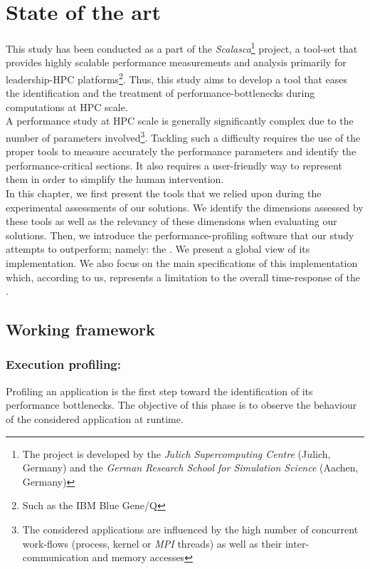 



\chapter{State of the art}\label{chapter:stateOfTheArt}
	This study has been conducted as a part of the \emph{Scalasca}\footnote{The project is developed by the \emph{J$\ddot{u}$lich Supercomputing Centre} (J$\ddot{u}$lich, Germany) and the \emph{German Research School for Simulation Science} (Aachen, Germany)} \cite{zhukov2013assessing} project, a tool-set that provides highly scalable performance measurements and analysis primarily for leadership-HPC platforms\footnote{Such as the IBM Blue Gene/Q}.
	Thus, this study aims to develop a tool that eases the identification and the treatment of performance-bottlenecks during computations at HPC scale.\\

	A performance study at HPC scale is generally significantly complex due to the number of parameters involved\footnote{The considered applications are influenced by the high number of concurrent work-flows (process, kernel or \emph{MPI} threads) as well as their inter-communication and memory accesses}.   Tackling such a difficulty requires the use of the proper tools to measure accurately the performance parameters and identify the performance-critical sections.   It also requires a user-friendly way to represent them in order to simplify the human intervention.\\

	In this chapter, we first present the tools that we relied upon during the experimental assessments of our solutions.   We identify the dimensions assessed by these tools as well as the relevancy of these dimensions when evaluating our solutions.   Then, we introduce the performance-profiling software that our study attempts to outperform; namely: the \toolTargetSoftware.   We present a global view of its implementation.   We also focus on the main specifications of this implementation which, according to us, represents a limitation to the overall time-response of the \toolTargetSoftware.


\section{Working framework} \label{section:workingFramework}
	\subsection{Execution profiling: \toolProfiling} \label{section:executionProfiling}
		Profiling an application is the first step toward the identification of its performance bottlenecks.   The objective of this phase is to observe the behaviour of the considered application at runtime.\\


